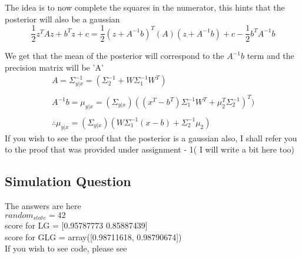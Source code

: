 The idea is to now complete the squares in the numerator, this hints that the posterior will also be a gaussian
\begin{equation}
    \frac{1}{2} z^T A z  + b^Tz + c = \frac{1}{2}(z + A^{-1}b)^T(A)(z + A^{-1}b) + c - \frac{1}{2}b^TA^{-1}b
\end{equation}

We get that the mean of the posterior will correspond to the $A^{-1}b $ term and the precision matrix  will be 'A'
\begin{gather*}
    \boxed{A    = \Sigma_{y|x}^{-1} = (\Sigma_2^{-1} + W \Sigma_1^{-1} W^T)}
    \\
    \\
    {A^{-1}b = \mu_{y|x} = (\Sigma_{y|x})((x^T - b^T)\Sigma_1^{-1} W^T + \mu_2^T \Sigma_2^{-1})^T)}
    \\
    \\
    \therefore \boxed{\mu_{y|x} = (\Sigma_{y|x})(W\Sigma_1^{-1}(x - b) + \Sigma_2^{-1} \mu_2)}
\end{gather*}
If you wish to see the proof that the posterior is a gaussian also, I shall refer you to the proof that was 
provided under assignment - 1( I will write a bit here too) \cite{CS3390}

\subsection{Simulation Question}
The answers are here 
\\
$random_{state} = 42$
\\
    score for LG = [0.95787773 0.85887439]
    \\
    score for GLG = array([0.98711618, 0.98790674])
    \\
If you wish to see code, please see \cite{CS3390}

